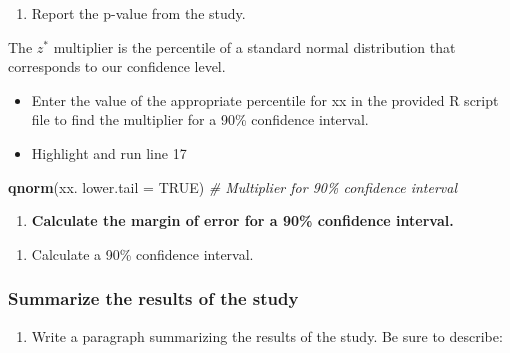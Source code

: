 \documentclass[
]{report}
\newenvironment{Shaded}{\begin{snugshade}}{\end{snugshade}}
\newcommand{\AttributeTok}[1]{\textcolor[rgb]{0.13,0.29,0.53}{#1}}
\newcommand{\CommentTok}[1]{\textcolor[rgb]{0.56,0.35,0.01}{\textit{#1}}}
\newcommand{\ConstantTok}[1]{\textcolor[rgb]{0.56,0.35,0.01}{#1}}
\newcommand{\FunctionTok}[1]{\textcolor[rgb]{0.13,0.29,0.53}{\textbf{#1}}}
\newcommand{\NormalTok}[1]{#1}
\providecommand{\tightlist}{%
  \setlength{\itemsep}{0pt}\setlength{\parskip}{0pt}}
\begin{document}
\begin{enumerate}
\def\labelenumi{\arabic{enumi}.}
\setcounter{enumi}{5}
\tightlist
\item
  Report the p-value from the study.
\end{enumerate}

\vspace{0.2in}

The \(z^*\) multiplier is the percentile of a standard normal distribution that corresponds to our confidence level.

\begin{itemize}
\item
  Enter the value of the appropriate percentile for xx in the provided R script file to find the multiplier for a 90\% confidence interval.
\item
  Highlight and run line 17
\end{itemize}

\begin{Shaded}
\begin{Highlighting}[]
\FunctionTok{qnorm}\NormalTok{(xx. }\AttributeTok{lower.tail =} \ConstantTok{TRUE}\NormalTok{) }\CommentTok{\# Multiplier for 90\% confidence interval}
\end{Highlighting}
\end{Shaded}

\begin{enumerate}
\def\labelenumi{\arabic{enumi}.}
\setcounter{enumi}{6}
\tightlist
\item
  \textbf{Calculate the margin of error for a 90\% confidence interval.}
\end{enumerate}

\vspace{0.5in}

\begin{enumerate}
\def\labelenumi{\arabic{enumi}.}
\setcounter{enumi}{7}
\tightlist
\item
  Calculate a 90\% confidence interval.
\end{enumerate}

\vspace{0.6in}

\subsubsection*{Summarize the results of the study}\label{summarize-the-results-of-the-study}

\begin{enumerate}
\def\labelenumi{\arabic{enumi}.}
\setcounter{enumi}{8}
\tightlist
\item
  Write a paragraph summarizing the results of the study. Be sure to describe:
\end{enumerate}
\end{document}
